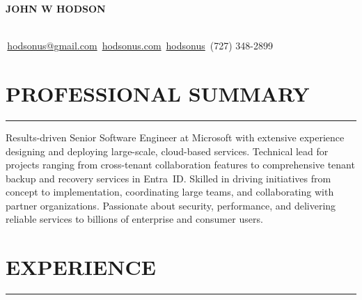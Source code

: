 \documentclass[11pt]{article}
\begin{document}
\noindent
\centerline{\huge \textbf{JOHN W HODSON}}\\[14pt] %
\vspace{0.2cm}
\faEnvelopeSquare \,\href{mailto:hodsonus@gmail.com}{hodsonus@gmail.com}
\hfill
\faHome \,\href{https://hodsonus.com}{hodsonus.com}
\hfill
\faGithub \,\href{https://github.com/hodsonus}{hodsonus}
\hfill
\faMobilePhone \,(727) 348-2899

\vspace{0.6cm}
\section*{PROFESSIONAL SUMMARY}
\hrule
\vspace{0.3cm}
\noindent
Results-driven Senior Software Engineer at Microsoft with extensive experience designing and deploying large-scale, cloud-based services. Technical lead for projects ranging from cross-tenant collaboration features to comprehensive tenant backup and recovery services in Entra~ID. Skilled in driving initiatives from concept to implementation, coordinating large teams, and collaborating with partner organizations. Passionate about security, performance, and delivering reliable services to billions of enterprise and consumer users.

\vspace{0.6cm}
\section*{EXPERIENCE}
\hrule
\vspace{0.3cm}
\end{document}
